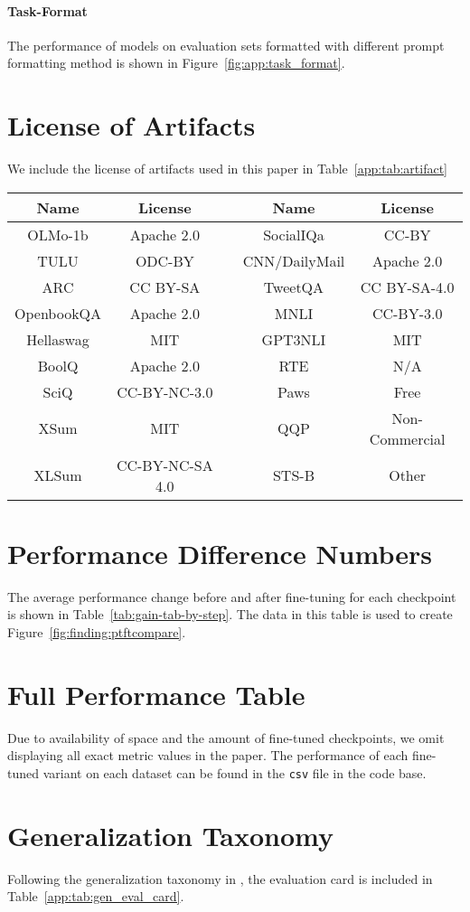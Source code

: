 \paragraph{Task-Format}
The performance of models on evaluation sets formatted with different prompt formatting method is shown in Figure~\ref{fig:app:task_format}.




\section{License of Artifacts}
We include the license of artifacts used in this paper in Table~\ref{app:tab:artifact}
\begin{table*}[t]
\scriptsize
\centering
\begin{tabular}{ccc|cc}
\toprule
\textbf{Name} & \textbf{License} &  & \textbf{Name} & \textbf{License} \\ \midrule
OLMo-1b & Apache 2.0 &  & SocialIQa & CC-BY \\
TULU & ODC-BY &  & \text{  }CNN/DailyMail & Apache 2.0 \\
ARC & CC BY-SA &  & TweetQA & CC BY-SA-4.0 \\
OpenbookQA & Apache 2.0 &  & MNLI & CC-BY-3.0 \\
Hellaswag & MIT &  & GPT3NLI & MIT \\
BoolQ & Apache 2.0 &  & RTE & N/A \\
SciQ & CC-BY-NC-3.0 &  & Paws & Free \\
XSum & MIT &  & QQP & Non-Commercial \\
XLSum & CC-BY-NC-SA 4.0 \text{  } &  & STS-B & Other \\ \bottomrule
\end{tabular}
\caption{License of artifacts used in this paper.}
\label{app:tab:artifact}
\end{table*}

\section{Performance Difference Numbers}
\label{sec:app:performance-numbers}

The average performance change before and after fine-tuning for each checkpoint is shown in Table~\ref{tab:gain-tab-by-step}.
The data in this table is used to create Figure~\ref{fig:finding:ptftcompare}.

\section{Full Performance Table}
Due to availability of space and the amount of fine-tuned checkpoints, we omit displaying all exact metric values in the paper.
The performance of each fine-tuned variant on each dataset can be found in the \texttt{csv} file in the code base.


\section{Generalization Taxonomy}
\label{sec:app:generalization-taxo}
Following the generalization taxonomy in \citealp{hupkes2023taxonomy}, the evaluation card is included in Table~\ref{app:tab:gen_eval_card}.
